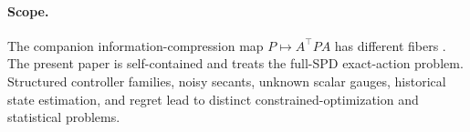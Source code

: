 \paragraph{Scope.}
The companion information-compression map \(P\mapsto A^\top PA\) has different
fibers \informationgeometrycite.  The present paper is self-contained and
treats the full-SPD exact-action problem.  Structured controller families,
noisy secants, unknown scalar gauges, historical state estimation, and regret
lead to distinct constrained-optimization and statistical problems.
